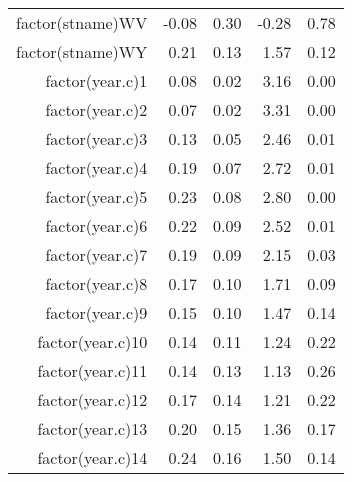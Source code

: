 \begin{table}[ht]
\begin{tabular}{rrrrr}
  factor(stname)WV & -0.08 & 0.30 & -0.28 & 0.78 \\ 
  factor(stname)WY & 0.21 & 0.13 & 1.57 & 0.12 \\ 
  factor(year.c)1 & 0.08 & 0.02 & 3.16 & 0.00 \\ 
  factor(year.c)2 & 0.07 & 0.02 & 3.31 & 0.00 \\ 
  factor(year.c)3 & 0.13 & 0.05 & 2.46 & 0.01 \\ 
  factor(year.c)4 & 0.19 & 0.07 & 2.72 & 0.01 \\ 
  factor(year.c)5 & 0.23 & 0.08 & 2.80 & 0.00 \\ 
  factor(year.c)6 & 0.22 & 0.09 & 2.52 & 0.01 \\ 
  factor(year.c)7 & 0.19 & 0.09 & 2.15 & 0.03 \\ 
  factor(year.c)8 & 0.17 & 0.10 & 1.71 & 0.09 \\ 
  factor(year.c)9 & 0.15 & 0.10 & 1.47 & 0.14 \\ 
  factor(year.c)10 & 0.14 & 0.11 & 1.24 & 0.22 \\ 
  factor(year.c)11 & 0.14 & 0.13 & 1.13 & 0.26 \\ 
  factor(year.c)12 & 0.17 & 0.14 & 1.21 & 0.22 \\ 
  factor(year.c)13 & 0.20 & 0.15 & 1.36 & 0.17 \\ 
  factor(year.c)14 & 0.24 & 0.16 & 1.50 & 0.14 \\ 
   \hline
\end{tabular}
\end{table}
